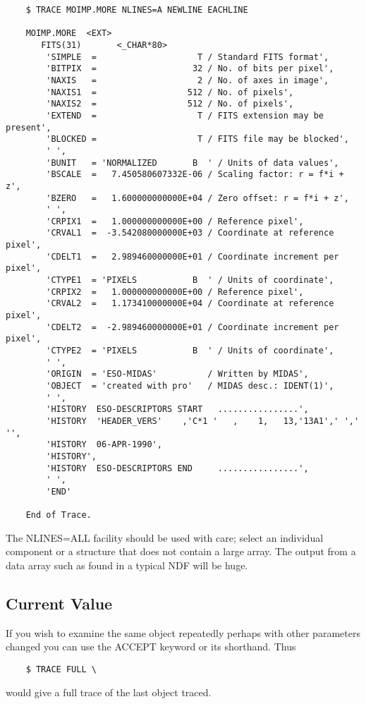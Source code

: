 \begin{verbatim}
    $ TRACE MOIMP.MORE NLINES=A NEWLINE EACHLINE

    MOIMP.MORE  <EXT>
       FITS(31)       <_CHAR*80>      
        'SIMPLE  =                    T / Standard FITS format',
        'BITPIX  =                   32 / No. of bits per pixel',
        'NAXIS   =                    2 / No. of axes in image',
        'NAXIS1  =                  512 / No. of pixels',
        'NAXIS2  =                  512 / No. of pixels',
        'EXTEND  =                    T / FITS extension may be present',
        'BLOCKED =                    T / FITS file may be blocked',
        ' ',
        'BUNIT   = 'NORMALIZED       B  ' / Units of data values',
        'BSCALE  =   7.450580607332E-06 / Scaling factor: r = f*i + z',
        'BZERO   =   1.600000000000E+04 / Zero offset: r = f*i + z',
        ' ',
        'CRPIX1  =   1.000000000000E+00 / Reference pixel',
        'CRVAL1  =  -3.542080000000E+03 / Coordinate at reference pixel',
        'CDELT1  =   2.989460000000E+01 / Coordinate increment per pixel',
        'CTYPE1  = 'PIXELS           B  ' / Units of coordinate',
        'CRPIX2  =   1.000000000000E+00 / Reference pixel',
        'CRVAL2  =   1.173410000000E+04 / Coordinate at reference pixel',
        'CDELT2  =  -2.989460000000E+01 / Coordinate increment per pixel',
        'CTYPE2  = 'PIXELS           B  ' / Units of coordinate',
        ' ',
        'ORIGIN  = 'ESO-MIDAS'          / Written by MIDAS',
        'OBJECT  = 'created with pro'   / MIDAS desc.: IDENT(1)',
        ' ',
        'HISTORY  ESO-DESCRIPTORS START   ................',
        'HISTORY  'HEADER_VERS'    ,'C*1 '   ,    1,   13,'13A1',' ',' '',
        'HISTORY  06-APR-1990',
        'HISTORY',
        'HISTORY  ESO-DESCRIPTORS END     ................',
        ' ',
        'END'

    End of Trace.
\end{verbatim}
\normalsize
The NLINES=ALL facility should be used with care; select an individual
component or a structure that does not contain a large array.  The 
output from a data array such as found in a typical NDF will be huge.
\subsection{Current Value}
If you wish to examine the same object repeatedly perhaps with other
parameters changed you can use the ACCEPT keyword or its shorthand.
Thus
\small
\begin{verbatim}
    $ TRACE FULL \
\end{verbatim}
\normalsize
would give a full trace of the last object traced.
\newpage
\appendix
